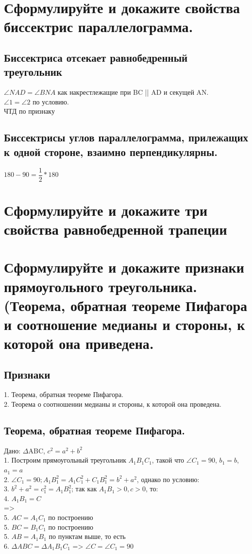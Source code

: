 \documentclass[12pt, letterpaper]{article}
\begin{document}
\section {Сформулируйте и докажите свойства биссектрис параллелограмма.}
\subsection{Биссектриса отсекает равнобедренный треугольник}
$\angle NAD = \angle BNA $ как накрестлежащие при BC || AD и секущей AN. \\
$\angle 1 = \angle 2 $ по условию. \\
ЧТД по признаку \\
\subsection{Биссектрисы углов параллелограмма, прилежащих к одной стороне, взаимно перпендикулярны.}
$180-90=\dfrac{1}{2}*180$\\


\section {Сформулируйте и докажите три свойства равнобедренной трапеции}
\section {Сформулируйте и докажите признаки прямоугольного треугольника. (Теорема, обратная теореме Пифагора и соотношение медианы и стороны, к которой она приведена.}
\subsection{Признаки}
1. Теорема, обратная теореме Пифагора. \\
2. Теорема о соотношении медианы и стороны, к которой она проведена. \\

\subsection{Теорема, обратная теореме Пифагора.}
Дано: $\Delta$ABC, $c^2=a^2+b^2$ \\
1. Построим прямоугольный треугольник $A_1 B_1 C_1$, такой что $\angle C_1 = 90 $, $b_1=b$, $a_1=a$ \\
2. $\angle C_1=90; A_1 B_1^2 = A_1 C_1^2+C_1 B_1^2 = b^2+a^2$, однако по условию:\\
3. $b^2+a^2=c_1^2 = A_1 B_1^2$; так как $A_1 B_1>0, c>0$, то: \\
4. $A_1 B_1 = C$ \\
=> \\
5. $AC = A_1 C_1 $ по построению \\
5. $BC = B_1 C_1 $ по построению \\
5. $AB = A_1 B_1 $ по пунктам выше, то есть \\
6. $\Delta ABC = \Delta A_1 B_1 C_1 $ => $\angle C = \angle C_1 = 90 $ \\
\end{document}
